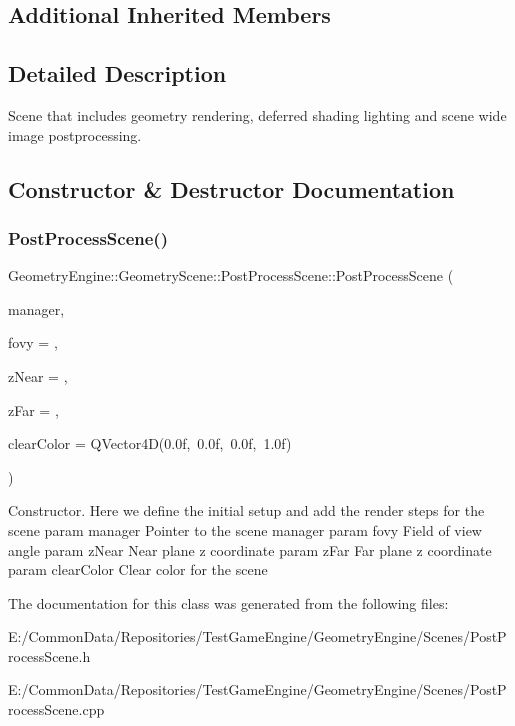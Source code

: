 \subsection*{Additional Inherited Members}


\subsection{Detailed Description}
Scene that includes geometry rendering, deferred shading lighting and scene wide image postprocessing. 

\subsection{Constructor \& Destructor Documentation}
\mbox{\label{class_geometry_engine_1_1_geometry_scene_1_1_post_process_scene_a1b5d3ffbc35c2490077edd12ef53c5f8}} 
\subsubsection{\texorpdfstring{PostProcessScene()}{PostProcessScene()}}
{\footnotesize\ttfamily Geometry\+Engine\+::\+Geometry\+Scene\+::\+Post\+Process\+Scene\+::\+Post\+Process\+Scene (\begin{DoxyParamCaption}\item[{\mbox{\hyperlink{class_geometry_engine_1_1_scene_manager}{Scene\+Manager}} $\ast$}]{manager,  }\item[{G\+Ldouble}]{fovy = {},  }\item[{G\+Ldouble}]{z\+Near = {},  }\item[{G\+Ldouble}]{z\+Far = {},  }\item[{Q\+Vector4D}]{clear\+Color = {\ttfamily QVector4D(0.0f,~0.0f,~0.0f,~1.0f)} }\end{DoxyParamCaption})}

Constructor. Here we define the initial setup and add the render steps for the scene param manager Pointer to the scene manager param fovy Field of view angle param z\+Near Near plane z coordinate param z\+Far Far plane z coordinate param clear\+Color Clear color for the scene 

The documentation for this class was generated from the following files\+:\begin{DoxyCompactItemize}
\item 
E\+:/\+Common\+Data/\+Repositories/\+Test\+Game\+Engine/\+Geometry\+Engine/\+Scenes/Post\+Process\+Scene.\+h\item 
E\+:/\+Common\+Data/\+Repositories/\+Test\+Game\+Engine/\+Geometry\+Engine/\+Scenes/Post\+Process\+Scene.\+cpp\end{DoxyCompactItemize}
